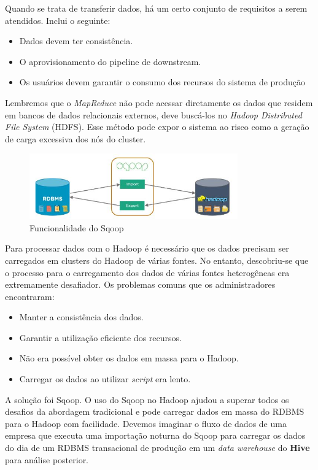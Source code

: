 \documentclass[a4paper,11pt]{article}
\begin{document}
Quando se trata de transferir dados, há um certo conjunto de requisitos a serem atendidos. Inclui o seguinte: \vspace{-1em}
\begin{itemize}
	\item Dados devem ter consistência.
	\item O aprovisionamento do pipeline de downstream. 
	\item Os usuários devem garantir o consumo dos recursos do sistema de produção
\end{itemize}
Lembremos que o \textit{MapReduce} não pode acessar diretamente os dados que residem em bancos de dados relacionais externos, deve buscá-los no \textit{Hadoop Distributed File System} (HDFS). Esse método pode expor o sistema ao risco como a geração de carga excessiva dos nós do cluster.

\begin{figure}[H]
	\centering
	\includegraphics[width=0.8\textwidth]{imagem/transferencia.jpg}
	\caption{Funcionalidade do Sqoop}
\end{figure}

Para processar dados com o Hadoop é necessário que os dados precisam ser carregados em clusters do Hadoop de várias fontes. No entanto, descobriu-se que o processo para o carregamento dos dados de várias fontes heterogêneas era extremamente desafiador. Os problemas comuns que os administradores encontraram: \vspace{-1em}
\begin{itemize}
	\item Manter a consistência dos dados.
	\item Garantir a utilização eficiente dos recursos.
	\item Não era possível obter os dados em massa para o Hadoop.
	\item Carregar os dados ao utilizar \textit{script} era lento.
\end{itemize}

A solução foi Sqoop. O uso do Sqoop no Hadoop ajudou a superar todos os desafios da abordagem tradicional e pode carregar dados em massa do RDBMS para o Hadoop com facilidade. Devemos imaginar o fluxo de dados de uma empresa que executa uma importação noturna do Sqoop para carregar os dados do dia de um RDBMS transacional de produção em um \textit{data warehouse} do \textbf{Hive} para análise posterior. 
\end{document}
